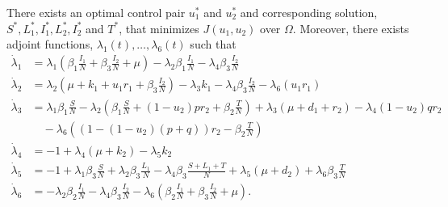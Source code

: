 \begin{theorem}
    There exists an optimal control pair $u_{1}^{*}$ and $u_{2}^{*}$ and 
    corresponding solution, $S^{*}, L_{1}^{*}, I_{1}^{*}, L_{2}^{*}, I_{2}^{*}$
    and $T^{*}$, that minimizes $J(u_1,u_2)$ over $\Omega$. Moreover, there exists
    adjoint functions, $\lambda_{1}(t), \ldots, \lambda_{6}(t)$ such that
    \begin{align*}
	    \dot{\lambda}_1	&= 
	        \lambda_{1} \left(\beta_{1}\frac{I_1}{N} + \beta_{3}\frac{I_2}{N} 
	            + \mu \right)
	       -\lambda_{2} \beta_{1}\frac{I_1}{N}
	       -\lambda_{4} \beta_{3}\frac{I_2}{N}
        \\
        \dot{\lambda}_2	&= 
	        \lambda_{2} \left( \mu + k_1 + u_1 r_1 + \beta_{3}\frac{I_2}{N}         \right)
	       -\lambda_{3} k_1
	       -\lambda_{4} \beta_{3}\frac{I_2}{N}
	       -\lambda_{6} \left( u_1 r_1 \right)
        \\
        \dot{\lambda}_3	&= 
	        \lambda_{1} \beta_{1}\frac{S}{N}
	       -\lambda_{2} \left( \beta_{1}\frac{S}{N} + (1 - u_2)pr_2 +
	            \beta_{2}\frac{T}{N} \right)
	       +\lambda_{3} \left( \mu + d_1 + r_2 \right)
	       -\lambda_{4} \left(1 - u_2\right)qr_2  \\
	       &\quad -\lambda_{6} \left((1 - ( 1- u_2)(p+q))r_2 - \beta_{2}\frac{T}{N}
	            \right)
	   \\
	   \dot{\lambda}_4	&= -1
	       +\lambda_{4} \left( \mu + k_2 \right)
	       -\lambda_{5} k_2
        \\
        \dot{\lambda}_5	&= -1
	       +\lambda_{1} \beta_{3}\frac{S}{N} 
	       +\lambda_{2} \beta_{3}\frac{L_1}{N}
	       -\lambda_{4} \beta_{3}\frac{S + L_1 + T}{N}
	       +\lambda_{5} \left( \mu + d_2 \right)
	       +\lambda_{6} \beta_{3}\frac{T}{N}
        \\
        \dot{\lambda}_6	&= 
	       -\lambda_{2} \beta_{2}\frac{I_1}{N}
	       -\lambda_{4} \beta_{3}\frac{I_2}{N}
	       -\lambda_{6} \left( \beta_{2}\frac{I_1}{N} + \beta_{3}\frac{I_2}{N}
	            + \mu \right).
    \end{align*}
\end{theorem}

